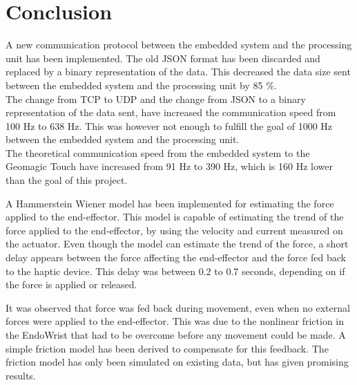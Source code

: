 \chapter{Conclusion}\label{cha:conclusion}


A new communication protocol between the embedded system and the processing unit has been implemented. The old JSON format has been discarded and replaced by a binary representation of the data. This decreased the data size sent between the embedded system and the processing unit by 85 \%.\\ 
The change from TCP to UDP and the change from JSON to a binary representation of the data sent, have increased the communication speed from 100 Hz to 638 Hz. This was however not enough to fulfill the goal of 1000 Hz between the embedded system and the processing unit.\\
The theoretical communication speed from the embedded system to the Geomagic Touch have increased from 91 Hz to 390 Hz, which is 160 Hz lower than the goal of this project. 



A Hammerstein Wiener model has been implemented for estimating the force applied to the end-effector. This model is capable of estimating the trend of the force applied to the end-effector, by
using the velocity and current measured on the actuator. Even though the model can estimate the trend of the force, a short delay appears between the force affecting the end-effector and the force fed back to the haptic device. This delay was between 0.2 to 0.7 seconds, depending on if the force is applied or released. 



It was observed that force was fed back during movement, even when no external forces were applied to the end-effector. This was due to the nonlinear friction in the EndoWrist that had to be overcome before any movement could be made. A simple friction model has been derived to compensate for this feedback. The friction model has only been simulated on existing data, but has given promising results. 


